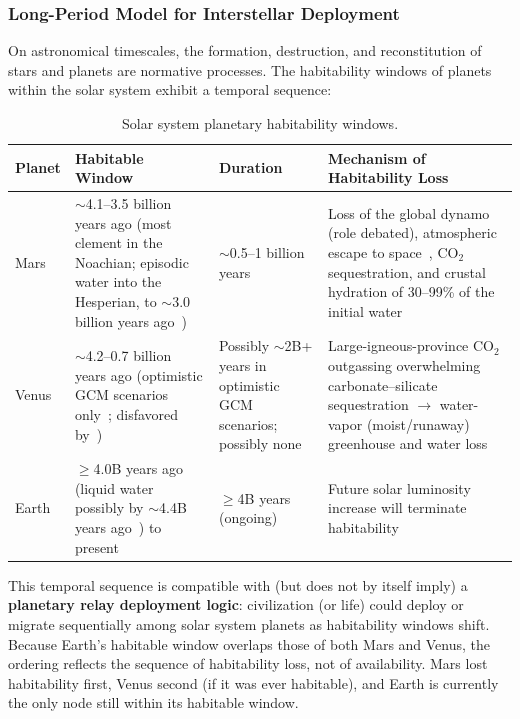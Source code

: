 \documentclass[aps,prd,twocolumn,superscriptaddress,nofootinbib]{revtex4-2}
\begin{document}
\subsubsection{Long-Period Model for Interstellar Deployment}\label{sec:long-period}

On astronomical timescales, the formation, destruction, and reconstitution of stars and planets are normative processes. The habitability windows of planets within the solar system exhibit a temporal sequence:

\begin{table}[htbp]
\caption{Solar system planetary habitability windows.}
\label{tab:habitability-windows}
\footnotesize
\begin{tabular}{P{0.083\textwidth}P{0.283\textwidth}P{0.176\textwidth}P{0.330\textwidth}}
\toprule
Planet & Habitable Window & Duration & Mechanism of Habitability Loss \\
\midrule
Mars & ${\sim}$4.1--3.5 billion years ago (most clement in the Noachian; episodic water into the Hesperian, to ${\sim}$3.0 billion years ago~\cite{Carr2010}) & ${\sim}$0.5--1 billion years & Loss of the global dynamo (role debated), atmospheric escape to space~\cite{Jakosky2018}, CO$_{2}$ sequestration, and crustal hydration of 30--99\% of the initial water~\cite{Scheller2021} \\
Venus & ${\sim}$4.2--0.7 billion years ago (optimistic GCM scenarios only~\cite{Way2016,Way2020}; disfavored by~\cite{Constantinou2024,Turbet2021,Warren2023}) & Possibly ${\sim}$2B+ years in optimistic GCM scenarios; possibly none~\cite{Constantinou2024,Turbet2021,Warren2023} & Large-igneous-province CO$_{2}$ outgassing overwhelming carbonate--silicate sequestration $\to$ water-vapor (moist/runaway) greenhouse and water loss~\cite{Way2020} \\
Earth & $\geq$4.0B years ago (liquid water possibly by ${\sim}$4.4B years ago~\cite{Wilde2001}) to present & $\geq$4B years (ongoing) & Future solar luminosity increase will terminate habitability \\
\bottomrule
\end{tabular}
\end{table}

This temporal sequence is compatible with (but does not by itself imply) a \textbf{planetary relay deployment logic}: civilization (or life) could deploy or migrate sequentially among solar system planets as habitability windows shift. Because Earth's habitable window overlaps those of both Mars and Venus, the ordering reflects the sequence of habitability loss, not of availability. Mars lost habitability first, Venus second (if it was ever habitable), and Earth is currently the only node still within its habitable window.
\end{document}
